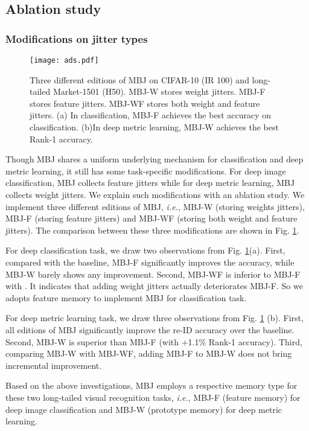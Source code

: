 \documentclass[final]{cvpr}
\def\ie{\textit{i.e.}}
\begin{document}
\subsection{Ablation study}\label{sec:ab_exp}

\subsubsection{Modifications on jitter types}
\begin{figure}[h] 
	\centering 
	\texttt{[image: ads.pdf]} 
	\vspace{-0.1cm}
\caption{Three different editions of MBJ on CIFAR-10 (IR 100) and long-tailed Market-1501 (H50). MBJ-W stores weight jitters. MBJ-F stores feature jitters. MBJ-WF stores both weight and feature jitters. (a) In classification, MBJ-F achieves the best accuracy on classification. (b)In deep metric learning, MBJ-W achieves the best Rank-1 accuracy.}
\label{fig:ablation}
\end{figure}
Though MBJ shares a uniform underlying mechanism for classification and deep metric learning, it still has some task-specific modifications. For deep image classification, MBJ collects feature jitters while for deep metric learning, MBJ collects weight jitters. We explain such modifications with an ablation study. We implement three different editions of MBJ, \ie, MBJ-W (storing weights jitters), MBJ-F (storing feature jitters) and MBJ-WF (storing both weight and feature jitters). The comparison between these three modifications are shown in Fig. \ref{fig:ablation}.

For deep classification task, we draw two observations from Fig. \ref{fig:ablation}{(a)}. First, compared with the baseline, MBJ-F significantly improves the accuracy, while MBJ-W barely shows any improvement. Second, MBJ-WF is inferior to MBJ-F with . It indicates that adding weight jitters actually deteriorates MBJ-F. So we adopts feature memory to implement MBJ for classification task. 

For deep metric learning task, we draw three observations from Fig. \ref{fig:ablation} (b). First, all editions of MBJ significantly improve the re-ID accuracy over the baseline. Second, MBJ-W is superior than MBJ-F (with +1.1\% Rank-1 accuracy). Third, comparing MBJ-W with MBJ-WF, adding MBJ-F to MBJ-W does not bring incremental improvement.

Based on the above investigations, MBJ employs a respective memory type for these two long-tailed visual recognition tasks, \ie, MBJ-F (feature memory) for deep image classification and MBJ-W (prototype memory) for deep metric learning. 
\end{document}
